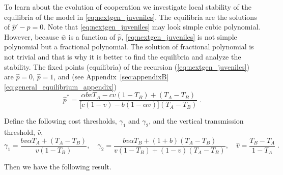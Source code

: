 \documentclass[12pt]{extarticle}
\begin{document}
To learn about the evolution of cooperation we investigate local stability of the equilibria of the model in \autoref{eq:nextgen_juveniles}.
The equilibria are the solutions of $\hat{p}'-\hat{p}=0$. Note that \autoref{eq:nextgen_juveniles} may look simple cubic polynomial. However, because $\bar{w}$ is a function of $\hat{p}$, \autoref{eq:nextgen_juveniles} is not simple polynomial but a fractional polynomial. 
The solution of fractional polynomial is not trivial and that is why it is better to find the equilibria and analyze the stability.
The fixed points (equilibria) of the recursion (\autoref{eq:nextgen_juveniles}) are $\hat p=0$, $\hat p=1$, and (see Appendix~\ref{sec:appendixB} \autoref{eq:general_equilibrium_appendix})
\begin{equation} \label{eq:general_equilibrium}
  \hat{p}^* =  
  \frac{\alpha bvT_A - cv(1-T_B) + (T_A-T_B)}{\big[c(1-v) - b (1-\alpha v)\big] (T_A-T_B)} \;.
\end{equation}

Define the following cost thresholds, $\gamma_1$ and $\gamma_2$, and the vertical transmission threshold, $\hat v$,
\begin{equation} \label{eq:cost_thresholds_v_threshold} 
\gamma_1 = \frac{b v \alpha T_A + (T_A - T_B)}{v(1-T_B)}, \quad
\gamma_2 = \frac{b v \alpha T_B + (1+b) (T_A - T_B)}{v(1-T_B) + (1-v)(T_A-T_B)}, \quad
\hat v = \frac{T_B - T_A}{1-T_A} \;.
\end{equation}

Then we have the following result.
\\
\end{document}
